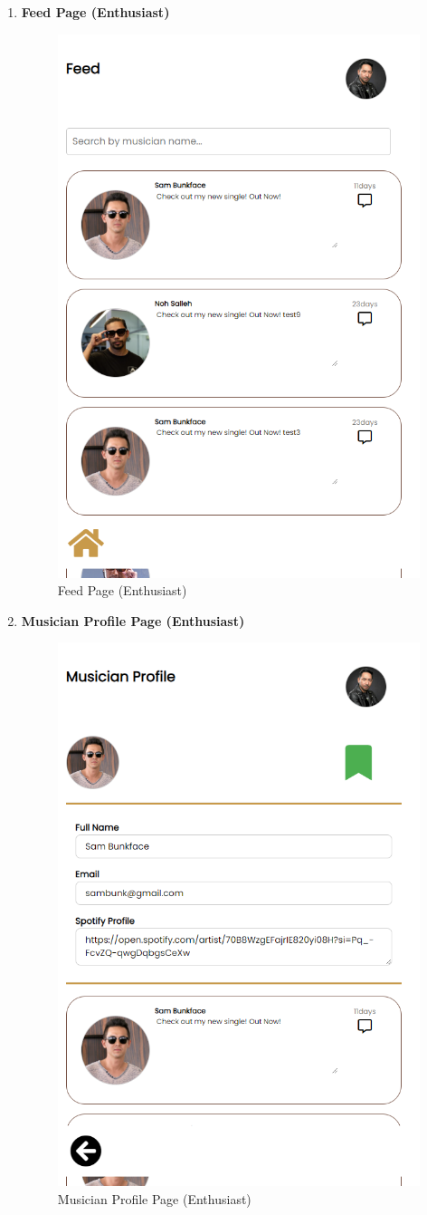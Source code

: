 \begin{enumerate}[1.]
    \item \textbf{Feed Page (Enthusiast)}
    \begin{figure}[h]
        \centering
        \includegraphics[width=0.5\linewidth]{mainmatter/images/frontend/ss/Feed (Enthusiast).png}
        \caption{Feed Page (Enthusiast)}
        \label{fig:myfig63}
    \end{figure}

    \item \textbf{Musician Profile Page (Enthusiast)}
    \begin{figure}[h]
        \centering
        \includegraphics[width=0.5\linewidth]{mainmatter/images/frontend/ss/Musician Profile (Enthusiast).png}
        \caption{Musician Profile Page (Enthusiast)}
        \label{fig:myfig64}
    \end{figure}


\end{enumerate}
